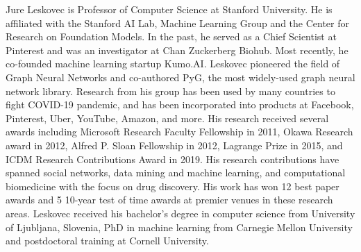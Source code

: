 Jure Leskovec is Professor of Computer Science at Stanford University. He is affiliated with the Stanford AI Lab, Machine Learning Group and the Center for Research on Foundation Models. In the past, he served as a Chief Scientist at Pinterest and was an investigator at Chan Zuckerberg Biohub. Most recently, he co-founded machine learning startup Kumo.AI. Leskovec pioneered the field of Graph Neural Networks and co-authored PyG, the most widely-used graph neural network library. Research from his group has been used by many countries to fight COVID-19 pandemic, and has been incorporated into products at Facebook, Pinterest, Uber, YouTube, Amazon, and more. His research received several awards including Microsoft Research Faculty Fellowship in 2011, Okawa Research award in 2012, Alfred P. Sloan Fellowship in 2012, Lagrange Prize in 2015, and ICDM Research Contributions Award in 2019. His research contributions have spanned social networks, data mining and machine learning, and computational biomedicine with the focus on drug discovery. His work has won 12 best paper awards and 5 10-year test of time awards at premier venues in these research areas. Leskovec received his bachelor's degree in computer science from University of Ljubljana, Slovenia, PhD in machine learning from Carnegie Mellon University and postdoctoral training at Cornell University.